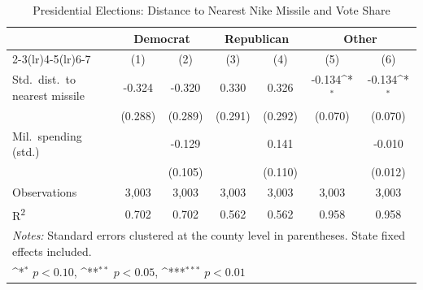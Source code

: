 \begin{table}[htbp]\centering
\setlength{\tabcolsep}{5pt}
\small
\def\sym#1{\ifmmode^{#1}\else\(^{#1}\)\fi}
\caption{Presidential Elections: Distance to Nearest Nike Missile and Vote Share}
\begin{tabular}{l*{6}{c}}
\toprule
                    &\multicolumn{2}{c}{Democrat}&\multicolumn{2}{c}{Republican}&\multicolumn{2}{c}{Other}\\
\cmidrule(lr){2-3}\cmidrule(lr){4-5}\cmidrule(lr){6-7}
                    &\multicolumn{1}{c}{(1)}&\multicolumn{1}{c}{(2)}&\multicolumn{1}{c}{(3)}&\multicolumn{1}{c}{(4)}&\multicolumn{1}{c}{(5)}&\multicolumn{1}{c}{(6)}\\
\midrule
Std.\ dist.\ to nearest missile
                    &      -0.324         &      -0.320         &       0.330         &       0.326         &      -0.134\sym{*}  &      -0.134\sym{*}  \\
                    &     (0.288)         &     (0.289)         &     (0.291)         &     (0.292)         &     (0.070)         &     (0.070)         \\
Mil.\ spending (std.)
                    &                     &      -0.129         &                     &       0.141         &                     &      -0.010         \\
                    &                     &     (0.105)         &                     &     (0.110)         &                     &     (0.012)         \\
\midrule
Observations        &       3,003         &       3,003         &       3,003         &       3,003         &       3,003         &       3,003         \\
R\textsuperscript{2}&       0.702         &       0.702         &       0.562         &       0.562         &       0.958         &       0.958         \\
\bottomrule
\multicolumn{7}{l}{\footnotesize \textit{Notes:} Standard errors clustered at the county level in parentheses. State fixed effects included.}\\
\multicolumn{7}{l}{\footnotesize \sym{*} \(p<0.10\), \sym{**} \(p<0.05\), \sym{***} \(p<0.01\)}\\
\end{tabular}
\end{table}

